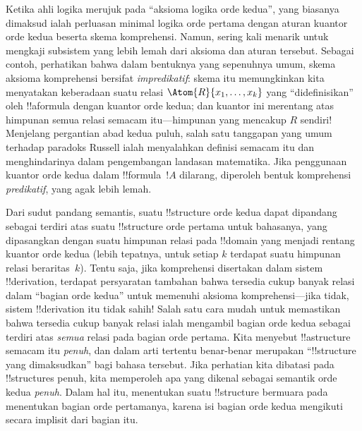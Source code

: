 \documentclass[../../../include/open-logic-section]{subfiles}
\begin{document}
Ketika ahli logika merujuk pada ``aksioma logika orde kedua'', yang biasanya
dimaksud ialah perluasan minimal logika orde pertama dengan aturan kuantor
orde kedua beserta skema komprehensi. Namun, sering kali menarik untuk
mengkaji subsistem yang lebih lemah dari aksioma dan aturan tersebut. Sebagai
contoh, perhatikan bahwa dalam bentuknya yang sepenuhnya umum, skema aksioma
komprehensi bersifat \emph{impredikatif}: skema itu memungkinkan kita
menyatakan keberadaan suatu relasi $\Atom{R}{x_1, \dots, x_k}$ yang
``didefinisikan'' oleh !!a{formula} dengan kuantor orde kedua; dan kuantor ini
merentang atas himpunan semua relasi semacam itu---himpunan yang mencakup $R$
sendiri!{} Menjelang pergantian abad kedua puluh, salah satu tanggapan yang
umum terhadap paradoks Russell ialah menyalahkan definisi semacam itu dan
menghindarinya dalam pengembangan landasan matematika. Jika penggunaan
kuantor orde kedua dalam !!{formula}~$!A$ dilarang, diperoleh bentuk
komprehensi {\em predikatif}, yang agak lebih lemah.

Dari sudut pandang semantis, suatu !!{structure} orde kedua dapat dipandang
sebagai terdiri atas suatu !!{structure} orde pertama untuk bahasanya, yang
dipasangkan dengan suatu himpunan relasi pada !!{domain} yang menjadi rentang
kuantor orde kedua (lebih tepatnya, untuk setiap $k$ terdapat suatu himpunan
relasi beraritas~$k$). Tentu saja, jika komprehensi disertakan dalam sistem
!!{derivation}, terdapat persyaratan tambahan bahwa tersedia cukup banyak
relasi dalam ``bagian orde kedua'' untuk memenuhi aksioma komprehensi---jika
tidak, sistem !!{derivation} itu tidak sahih!{} Salah satu cara mudah untuk
memastikan bahwa tersedia cukup banyak relasi ialah mengambil bagian orde
kedua sebagai terdiri atas \emph{semua} relasi pada bagian orde pertama.
Kita menyebut !!a{structure} semacam itu \emph{penuh}, dan dalam arti tertentu
benar-benar merupakan ``!!{structure} yang dimaksudkan'' bagi bahasa tersebut.
Jika perhatian kita dibatasi pada !!{structure}s penuh, kita memperoleh apa
yang dikenal sebagai semantik orde kedua \emph{penuh}. Dalam hal itu,
menentukan suatu !!{structure} bermuara pada menentukan bagian orde pertamanya,
karena isi bagian orde kedua mengikuti secara implisit dari bagian itu.
\end{document}
